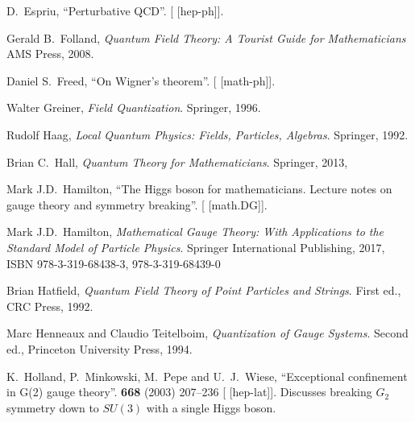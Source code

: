 \begin{thebibliography}{99}
D.~Espriu,
``Perturbative QCD''.
[ [hep-ph]].

Gerald B.~Folland,
\textit{Quantum Field Theory: A Tourist Guide for Mathematicians}
AMS Press, 2008.

Daniel S.~Freed,
``On Wigner's theorem''.
[ [math-ph]].


Walter Greiner,
\textit{Field Quantization}.
Springer, 1996.


Rudolf Haag,
\textit{Local Quantum Physics: Fields, Particles, Algebras}.
Springer, 1992.

Brian C.~Hall,
\textit{Quantum Theory for Mathematicians}.
Springer, 2013,
{\tt{}}

Mark J.D.\ Hamilton,
``The Higgs boson for mathematicians. Lecture notes on gauge theory and symmetry breaking''.
[ [math.DG]].

Mark J.D.\ Hamilton,
\textit{Mathematical Gauge Theory: With Applications to the Standard Model of Particle Physics}.
Springer International Publishing, 2017,
ISBN 978-3-319-68438-3, 978-3-319-68439-0
{\tt{}}

Brian Hatfield,
\textit{Quantum Field Theory of Point Particles and Strings}.
First ed., CRC Press, 1992.

Marc Henneaux and Claudio Teitelboim,
\textit{Quantization of Gauge Systems}.
Second ed., Princeton University Press, 1994.

K.~Holland, P.~Minkowski, M.~Pepe and U.~J.~Wiese,
``Exceptional confinement in G(2) gauge theory''.
 \textbf{668} (2003) 207--236
{\tt{}}
[ [hep-lat]].
Discusses breaking $G_{2}$ symmetry down to $SU(3)$ with a single Higgs boson.


\end{thebibliography}
